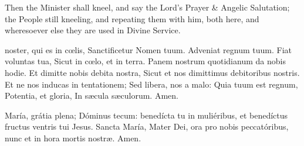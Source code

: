 \begin{rubric}
    Then the Minister shall kneel, and say the Lord's Prayer \& Angelic Salutation; the People still kneeling, and repeating them with him, both here, and wheresoever else they are used in Divine Service.
\end{rubric}
 noster, qui es in cœlis, Sanctificetur Nomen tuum. Adveniat regnum tuum. Fiat voluntas tua, Sicut in cœlo, et in terra. Panem nostrum quotidianum da nobis hodie. Et dimitte nobis debita nostra, Sicut et nos dimittimus debitoribus nostris. Et ne nos inducas in tentationem; Sed libera, nos a malo: Quia tuum est regnum, Potentia, et gloria, In sæcula sæculorum. Amen.
\par\noindent
{}
 María, grátia plena; Dóminus tecum: benedícta tu in muliéribus, et benedíctus fructus ventris tui Jesus. Sancta María, Mater Dei, ora pro nobis peccatóribus, nunc et in hora mortis nostræ. Amen.
